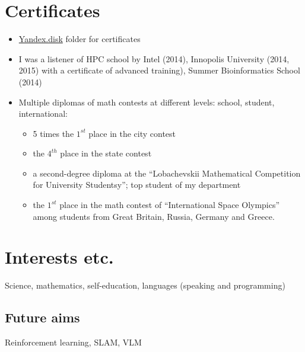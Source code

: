 \documentclass[letterpaper]{twentysecondcv} %
\begin{document}

\section{Certificates}
    {\begin{itemize}
        \item \href{https://yadi.sk/d/aSyzcZ44-_l-8w?w=1}{Yandex.disk} folder for certificates
        \item I was a listener of HPC school by Intel (2014), Innopolis University (2014, 2015) with a certificate of advanced training),
        Summer Bioinformatics School (2014)
        \item Multiple diplomas of math contests at different levels: school, student, international:
            {\begin{itemize}
            \item 5 times the $1^{st}$ place in the city contest
            \item the $4^{th}$ place in the state contest
            \item a second-degree diploma at the ``Lobachevskii Mathematical Competition for University Studentsy''; top student of my department
            \item the $1^{st}$ place in the math contest of ``International Space Olympics'' among students from Great Britain, Russia, Germany and Greece.
            \end{itemize}}

    \end{itemize}}

\section{Interests etc.}

Science, mathematics, self-education, languages (speaking and programming)

\subsection{Future aims}

Reinforcement learning, SLAM, VLM
\end{document}
